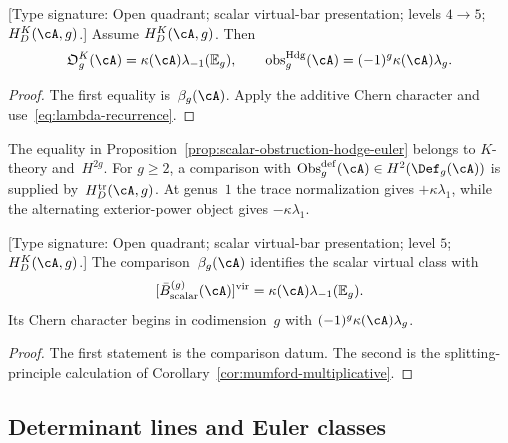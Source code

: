 \begin{proposition}
\label{prop:scalar-obstruction-hodge-euler}
\textup{[Type signature: Open quadrant; scalar virtual-bar
presentation; levels $4\to5$; $H_D^K(\cA,g)$.]}
Assume $H_D^K(\cA,g)$.  Then
\begin{equation}
 \mathfrak O_g^K(\cA)
 =\kappa(\cA)\lambda_{-1}(\mathbb E_g),
 \qquad
 \operatorname{obs}^{\mathrm{Hdg}}_g(\cA)
 =(-1)^g\kappa(\cA)\lambda_g.
 \label{eq:scalar-obs-hodge-euler}
\end{equation}
\end{proposition}

\begin{proof}
The first equality is~$\beta_g(\cA)$.  Apply the additive Chern
character and use~\eqref{eq:lambda-recurrence}.
\end{proof}

\begin{remark}
\label{rem:scalar-diagonal-honest}
The equality in Proposition~\ref{prop:scalar-obstruction-hodge-euler}
belongs to $K$-theory and~$H^{2g}$.  For $g\geq2$, a comparison with
$\operatorname{Obs}^{\mathrm{def}}_g(\cA)\in H^2(\Def_g(\cA))$
is supplied by~$H_D^{\mathrm{tr}}(\cA,g)$.  At genus~$1$ the trace
normalization gives $+\kappa\lambda_1$, while the alternating
exterior-power object gives $-\kappa\lambda_1$.
\end{remark}

\begin{lemma}
\label{lem:k-theoretic-globalization-bar}
\textup{[Type signature: Open quadrant; scalar virtual-bar
presentation; level $5$; $H_D^K(\cA,g)$.]}
The comparison~$\beta_g(\cA)$ identifies the scalar virtual class
with
\[
 [\bar B^{(g)}_{\mathrm{scalar}}(\cA)]^{\mathrm{vir}}
 =\kappa(\cA)\lambda_{-1}(\mathbb E_g).
\]
Its Chern character begins in codimension~$g$ with
$(-1)^g\kappa(\cA)\lambda_g$.
\end{lemma}

\begin{proof}
The first statement is the comparison datum.  The second is the
splitting-principle calculation of
Corollary~\ref{cor:mumford-multiplicative}.
\end{proof}

\subsection{Determinant lines and Euler classes}

